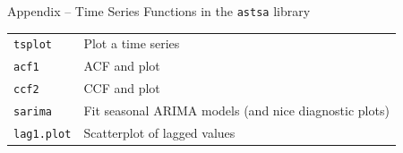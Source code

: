 \documentclass[ignorenonframetext,xcolor=x11names]{beamer}
\begin{document}
\begin{frame}[label=withcode]{Appendix -- Time Series Functions in the \texttt{astsa} library}
\footnotesize
\renewcommand{\arraystretch}{1.5}
\begin{tabularx}{\textwidth}{l|X} \hline
\texttt{tsplot} & Plot a time series \\
\texttt{acf1} & ACF and plot \\
\texttt{ccf2} & CCF and plot \\
\texttt{sarima} & Fit seasonal ARIMA models (and nice diagnostic plots) \\
\texttt{lag1.plot} & Scatterplot of lagged values \\ \hline
\end{tabularx}
\end{frame}
\end{document}
